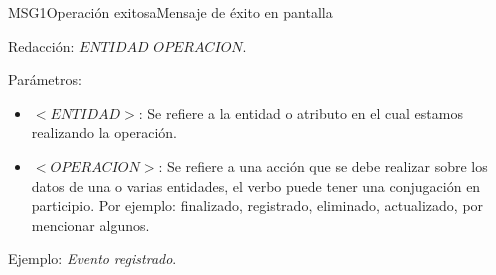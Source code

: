 \begin{mensaje}{MSG1}{Operación exitosa}{Mensaje de éxito en pantalla}
  
      
        \item[Redacción:] $ENTIDAD$ $OPERACION$.
    
        \item[Parámetros:] 
        \begin{itemize}
            \item $<ENTIDAD>$: Se refiere a la entidad o atributo en el cual estamos realizando la operación.
            \item $<OPERACION>$: Se refiere a una acción que se debe realizar sobre los datos de una o varias entidades, el verbo puede tener una conjugación en participio. Por ejemplo: finalizado, registrado, eliminado, actualizado, por mencionar algunos.
        \end{itemize}   
    
        \item[Ejemplo:] \textit{Evento} \textit{registrado}.
    \end{mensaje}

